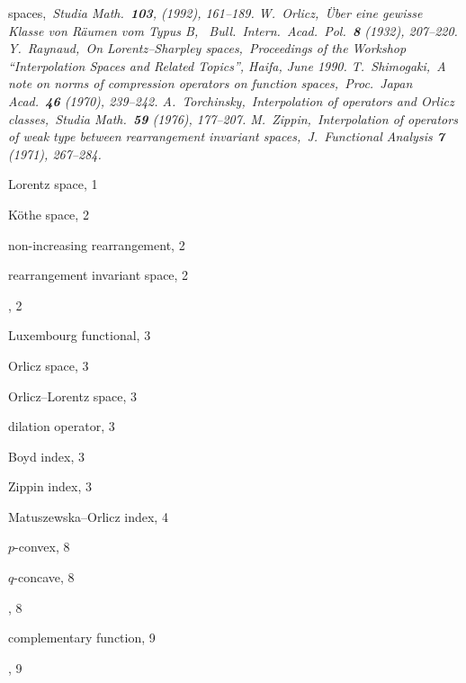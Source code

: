\begin{thebibliography}{99}
spaces,\sl\ 
Studia Math.\ {\bf 103}, (1992), 161--189.
\rm{} W.~Orlicz,\rm\ \"Uber eine gewisse Klasse von R\"aumen vom 
Typus B, \sl\
Bull.\ Intern.\ Acad.\ Pol.\ {\bf 8} (1932), 207--220.
\rm\bibitem{x} Y.~Raynaud,\rm\ On Lorentz--Sharpley spaces,\sl\ 
Proceedings of
the Workshop ``Interpolation Spaces and Related Topics'', Haifa, June 1990.
\rm\bibitem{1} T.~Shimogaki,\rm\ A note on norms of compression operators on
function
spaces,\sl\ Proc.\ Japan Acad.\ {\bf 46} (1970), 239--242.
\rm\bibitem{y} A.~Torchinsky,\rm\ Interpolation of operators and Orlicz 
classes,\sl\
Studia Math.\ {\bf 59} (1976), 177--207.
\rm\bibitem{z} M.~Zippin,\rm\ Interpolation of operators of weak type between
rearrangement invariant spaces,\sl\ J.\ Functional Analysis {\bf 7} (1971),
267--284.

\end{thebibliography}

\newpage

\begin{theindex}

\item Lorentz space, 1
\item K\"othe space, 2
\item non-increasing rearrangement, 2
\item rearrangement invariant space, 2
\item \phifunction, 2
\item Luxembourg functional, 3
\item Orlicz space, 3
\item Orlicz--Lorentz space, 3
\item dilation operator, 3
\item Boyd index, 3
\item Zippin index, 3
\item Matuszewska--Orlicz index, 4
\item $p$-convex, 8
\item $q$-concave, 8
\item \Nfunction, 8
\item complementary function, 9
\item \conditionJ, 9

\end{theindex}


